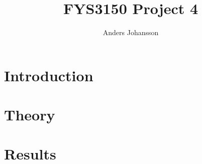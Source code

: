 \documentclass[12pt,english,a4paper]{article}
\title{FYS3150 Project 4}
\author{Anders Johansson}
\begin{document}
    \maketitle
    \pagestyle{fancy}
    \tableofcontents

    \begin{abstract}
    \end{abstract}

    \section{Introduction}

    \section{Theory}

    \section{Results}
\end{document}
